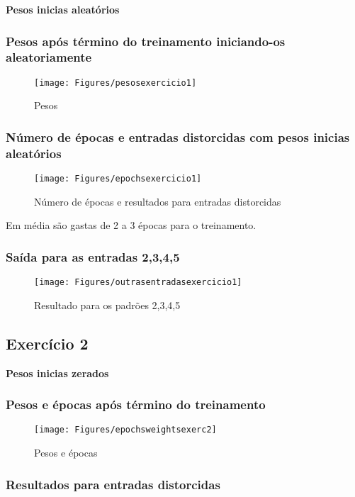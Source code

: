 \documentclass[hidelinks,12pt]{article}
\begin{document}
	{\textbf{\large Pesos inicias aleatórios}}
	
	\subsubsection{Pesos após término do treinamento iniciando-os aleatoriamente}

		\begin{figure}[h!]
			\centering
			\texttt{[image: Figures/pesosexercicio1]}
			\caption{Pesos}
		\end{figure}
	\newpage
	\subsubsection{Número de épocas e entradas distorcidas com pesos inicias aleatórios}

		\begin{figure}[h!]
			\centering
			\texttt{[image: Figures/epochsexercicio1]}
			\caption{Número de épocas e resultados para entradas distorcidas}
		\end{figure}
	
		\normalsize Em média são gastas de 2 a 3 épocas para o treinamento.

	\newpage
	\subsubsection{Saída para as entradas 2,3,4,5}

		\begin{figure}[h!]
			\centering
			\texttt{[image: Figures/outrasentradasexercicio1]}
			\caption{Resultado para os padrões 2,3,4,5}
		\end{figure}

\subsection{Exercício 2}
	\large {\textbf{Pesos inicias zerados}}
	
	\subsubsection{Pesos e épocas após término do treinamento}

		\begin{figure}[h!]
			\centering
			\texttt{[image: Figures/epochsweightsexerc2]}
			\caption{Pesos e épocas}
		\end{figure}
	\newpage
	\subsubsection{Resultados para entradas distorcidas}
\end{document}
